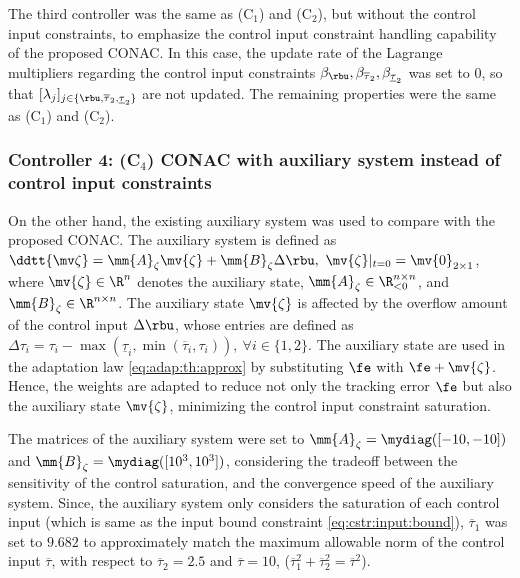 \documentclass[lettersize,journal]{IEEEtran}
\begin{document}
The third controller was the same as (C$_1$) and (C$_2$), but without the control input constraints, to emphasize the control input constraint handling capability of the proposed CONAC.
In this case, the update rate of the Lagrange multipliers regarding the control input constraints \ie $\beta_{\rbu},\beta_{\overline{\tau}_2},\beta_{\underline{\tau}_2}$ was set to $0$, so that $[\lambda_j]_{j\in\{\rbu,\overline{\tau}_2,\underline{\tau}_2\}}$ are not updated.
The remaining properties were the same as (C$_1$) and (C$_2$).

\subsubsection*{Controller 4: (C$_4$) CONAC with auxiliary system instead of control input constraints}

On the other hand, the existing auxiliary system \cite{Esfandiari:2014aa,Karason:1994aa,Esfandiari:2015aa} was used to compare with the proposed CONAC.
The auxiliary system is defined as $\ddtt{\mv\zeta} = \mm{A}_\zeta \mv{\zeta} + \mm{B}_\zeta \Delta\rbu,\ \mv{\zeta}\vert_{t=0} = \mv{0}_{2\times1}$, where $\mv{\zeta}\in\R^n$ denotes the auxiliary state, $\mm{A}_\zeta\in\R_{<0}^{n\times n}$, and $\mm{B}_\zeta\in\R^{n\times n}$.
The auxiliary state $\mv{\zeta}$ is affected by the overflow amount of the control input $\Delta\rbu$, whose entries are defined as $\Delta\tau_{i} = 
\tau_{i}-\max(\underline\tau_i,\min(\overline\tau_i,\tau_i)),\ \forall i\in\{1,2\}$.
The auxiliary state are used in the adaptation law \eqref{eq:adap:th:approx} by substituting $\fe$ with $\fe+\mv{\zeta}$.
Hence, the weights are adapted to reduce not only the tracking error $\fe$ but also the auxiliary state $\mv{\zeta}$, minimizing the control input constraint saturation.

The matrices of the auxiliary system were set to $\mm{A}_\zeta=\mydiag([-10,-10])$ and $\mm{B}_\zeta=\mydiag([10^3,10^3])$, considering the tradeoff between the sensitivity of the control saturation, and the convergence speed of the auxiliary system.
Since, the auxiliary system only considers the saturation of each control input (\ie which is same as the input bound constraint \eqref{eq:cstr:input:bound}), $\overline{\tau}_1$ was set to $9.682$ to approximately match the maximum allowable norm of the control input $\overline\tau$, with respect to $\overline{\tau}_2=2.5$ and $\overline{\tau}=10$, (\ie $\overline{\tau}_1^2+\overline{\tau}_2^2=\overline{\tau}^2$).
\end{document}

